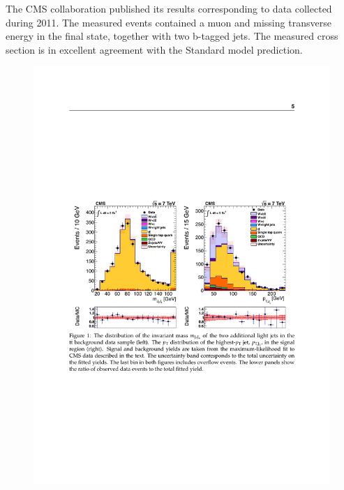 	
The CMS collaboration published its results corresponding to data collected during 2011. The measured events contained a muon and missing transverse energy in the final state, together with two b-tagged jets. The measured cross section is in excellent agreement with the Standard model prediction.\citep{Chatrchyan:2013uza}

\begin{figure}[htbp]
	\centering
		\includegraphics{Figures/cms_tot.pdf}
	\caption[CMS Wbb total cross section measurement]{\cite{Chatrchyan:2013uza} }
	\label{fig:cms_total}
\end{figure}
